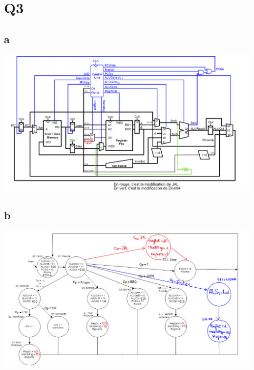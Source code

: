 \documentclass[11pt]{article}
\begin{document}
\section{Q3}
\subsection{a}
\begin{center}
\includegraphics[width=.9\linewidth]{./Question_3_a.png}
\end{center}
\subsection{b}
\begin{center}
\includegraphics[width=.9\linewidth]{./Question_3_b.png}
\end{center}
\end{document}
